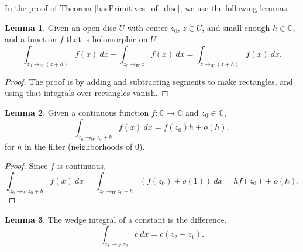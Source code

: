\documentclass{report}
\theoremstyle{definition}
\newtheorem{lemma}{Lemma}
\begin{document}
In the proof of Theorem \ref{hasPrimitives_of_disc}, we use the following lemmas.

\begin{lemma}
  \label{diff_of_wedges}
  Given an open disc $U$ with center $z_0$, $z\in U$, and small enough $h\in \mathbb C$, and a function $f$ that is holomorphic on $U$
  \begin{equation}
    \int_{z_0\to_W (z+h)} f(x)\ dx
    -
    \int_{z_0\to_W z} f(x)\ dx
    =
    \int_{z\to_W (z+h)} f(x)\ dx
    .
  \end{equation}
\end{lemma}

\begin{proof}
  The proof is by adding and subtracting segments to make rectangles, and using that integrals over rectangles vanish.
\end{proof}

\begin{lemma}
  \label{deriv_of_wedgeInt}
  Given a continuous function $f:\mathbb C\to\mathbb C$ and $z_0\in\mathbb C$,
  \begin{equation}
    \int_{z_0\to_W z_0+h}f(x)\ dx = f(z_0)h + o(h)
    ,
  \end{equation}
  for $h$ in the filter (neighborhoods of $0$).
\end{lemma}

\begin{proof}
  Since $f$ is continuous,
  \begin{equation}
    \int_{z_0\to_W z_0+h}f(x)\ dx
    =
    \int_{z_0\to_W z_0+h}(f(z_0)+o(1))\ dx
    =
    hf(z_0)+o(h)
    .
  \end{equation}
\end{proof}

\begin{lemma}
  \label{wedgeInt_of_const}
  The wedge integral of a constant is the difference.
\begin{equation}
  \int_{z_1\to_W z_2} c\ dx
  =
  c(z_2-z_1)
  .
\end{equation}
\end{lemma}
\end{document}
